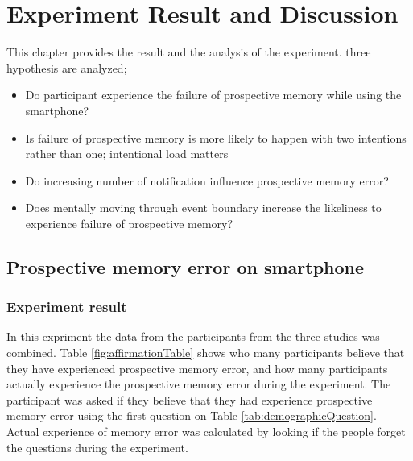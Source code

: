 \chapter{Experiment Result and Discussion}

This chapter provides the result and the analysis of the experiment. three hypothesis are analyzed;
\begin{itemize}
  \item{Do participant experience the failure of prospective memory while using the smartphone?}
  \item{Is failure of prospective memory is more likely to happen with two intentions rather than one; intentional load matters}
  \item{Do increasing number of notification influence prospective memory error?}
  \item{Does mentally moving through event boundary increase the likeliness to experience failure of prospective memory?}
\end{itemize}

\section{Prospective memory error on smartphone}

\subsection{Experiment result}
In this expriment the data from the participants from the three studies was combined.
Table \ref{fig:affirmationTable} shows who many participants believe that they have experienced prospective memory error,
and how many participants actually experience the prospective memory error during the experiment.
The participant was asked if they believe that they had experience prospective memory error using the first question on Table \ref{tab:demographicQuestion}.
Actual experience of memory error was calculated by looking if the people forget the questions during the experiment.



